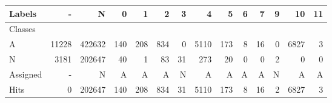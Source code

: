 \begin{tabular}{l|r|r|r|r|r|r|r|r|r|r|r|r|r}

Labels &      - &       N &    0 &    1 &    2 &   3 &     4 &    5 &  6 &   7 &  9 &    10 & 11 \\\hline
Classes  &        &         &      &      &      &     &       &      &    &     &    &       &    \\\hline
\hline
A        &  11228 &  422632 &  140 &  208 &  834 &   0 &  5110 &  173 &  8 &  16 &  0 &  6827 &  3 \\\hline
N        &   3181 &  202647 &   40 &    1 &   83 &  31 &   273 &   20 &  0 &   0 &  2 &     0 &  0 \\\hline
\hline
Assigned &      - &       N &    A &    A &    A &   N &     A &    A &  A &   A &  N &     A &  A \\\hline
Hits     &      0 &  202647 &  140 &  208 &  834 &  31 &  5110 &  173 &  8 &  16 &  2 &  6827 &  3 
\end{tabular}
